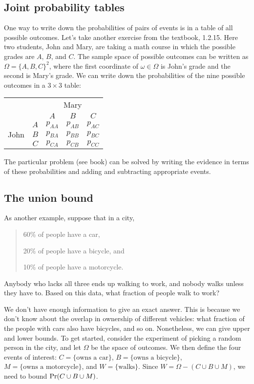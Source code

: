\subsection{Joint probability tables}

One way to write down the probabilities of pairs of events is in a
table of all possible outcomes. Let's take another exercise from the
textbook, 1.2.15. Here two students, John and Mary, are taking a math
course in which the possible grades are $A$, $B$, and $C$. The sample
space of possible outcomes can be written as $\Omega = \{A,B,C\}^2$,
where the first coordinate of $\omega \in \Omega$ is John's grade and
the second is Mary's grade. We can write down the probabilities of the
nine possible outcomes in a $3 \times 3$ table:

\begin{center}
\begin{tabular}{|cc|ccc|} \hline
\multicolumn{2}{|c|}{} & \multicolumn{3}{c|}{Mary} \\ 
\multicolumn{2}{|c|}{} & $A$ & $B$ & $C$ \\ \hline
\multirow{3}{*}{John} & $A$ & $p_{AA}$ & $p_{AB}$ & $p_{AC}$ \\ 
                      & $B$ & $p_{BA}$ & $p_{BB}$ & $p_{BC}$ \\ 
                      & $C$ & $p_{CA}$ & $p_{CB}$ & $p_{CC}$ \\ \hline
\end{tabular} 
\end{center}

\noindent
The particular problem (see book) can be solved by writing the evidence in terms of these probabilities and adding and subtracting appropriate events.

\subsection{The union bound}

As another example, suppose that in a city,
\begin{quote}
60\% of people have a car,

20\% of people have a bicycle, and

10\% of people have a motorcycle.
\end{quote}
Anybody who lacks all three ends up walking to work, and nobody walks
unless they have to. Based on this data, what fraction of people walk
to work?

We don't have enough information to give an exact answer. This is
because we don't know about the overlap in ownership of different
vehicles: what fraction of the people with cars also have bicycles,
and so on. Nonetheless, we can give upper and lower bounds. To get
started, consider the experiment of picking a random person in the
city, and let $\Omega$ be the space of outcomes. We then define the
four events of interest: $C = \{\mbox{owns a car}\}$, $B =
\{\mbox{owns a bicycle}\}$, $M = \{\mbox{owns a motorcycle}\}$, and $W
= \{\mbox{walks}\}$. Since $W = \Omega - (C \cup B \cup M)$, we need
to bound $\mbox{\rm Pr}(C \cup B \cup M)$.

